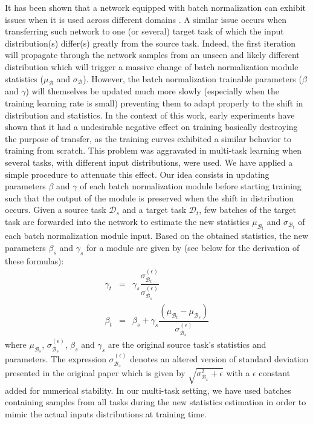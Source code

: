It has been shown that a network equipped with batch normalization \cite{ioffe2015batch} can exhibit issues when it is used across different domains \cite{li2018adaptive, chang2019domain}. A similar issue occurs when transferring such network to one (or several) target task of which the input distribution(s) differ(s) greatly from the source task. Indeed, the first iteration will propagate through the network samples from an unseen and likely different distribution which will trigger a massive change of batch normalization module statistics ($\mu_\mathcal{B}$ and $\sigma_\mathcal{B}$). However, the batch normalization trainable parameters ($\beta$ and $\gamma$) will themselves be updated much more slowly (especially when the training learning rate is small) preventing them to adapt properly to the shift in distribution and statistics. In the context of this work, early experiments have shown that it had a undesirable negative effect on training basically destroying the purpose of transfer, as the training curves exhibited a similar behavior to training from scratch. This problem was aggravated in multi-task learning when several tasks, with different input distributions, were used. We have applied a simple procedure to attenuate this effect. Our idea consists in updating parameters $\beta$ and $\gamma$ of each batch normalization module before starting training such that the output of the module is preserved when the shift in distribution occurs. Given a source task $\mathcal{D}_s$ and a target task $\mathcal{D}_t$, few batches of the target task are forwarded into the network to estimate the new statistics $\mu_{\mathcal{B}_t}$ and $\sigma_{\mathcal{B}_t}$ of each batch normalization module input. Based on the obtained statistics, the new parameters $\beta_s$ and $\gamma_s$ for a module are given by (see below for the derivation of these formulas):
\begin{eqnarray}
\gamma_t &=& \gamma_s \dfrac{\sigma^{(\epsilon)}_{\mathcal{B}_t}}{\sigma^{(\epsilon)}_{\mathcal{B}_s}}\label{app:mtask:eqn:bn_update_gamma}\\
\beta_t &=& \beta_s + \gamma_s  \dfrac{(\mu_{\mathcal{B}_t}-\mu_{\mathcal{B}_s})}{\sigma^{(\epsilon)}_{\mathcal{B}_s}}\label{app:mtask:eqn:bn_update_beta}
\end{eqnarray}
where $\mu_{\mathcal{B}_s}$, $\sigma^{(\epsilon)}_{\mathcal{B}_s}$, $\beta_s$ and $\gamma_s$ are the original source task's statistics and parameters. The expression $\sigma^{(\epsilon)}_{\mathcal{B}_x}$ denotes an altered version of standard deviation presented in the original paper which is given by $\sqrt{\sigma_{\mathcal{B}_x}^2 + \epsilon}$ with a $\epsilon$ constant added for numerical stability. In our multi-task setting, we have used batches containing samples from all tasks during the new statistics estimation in order to mimic the actual inputs distributions at training time.

